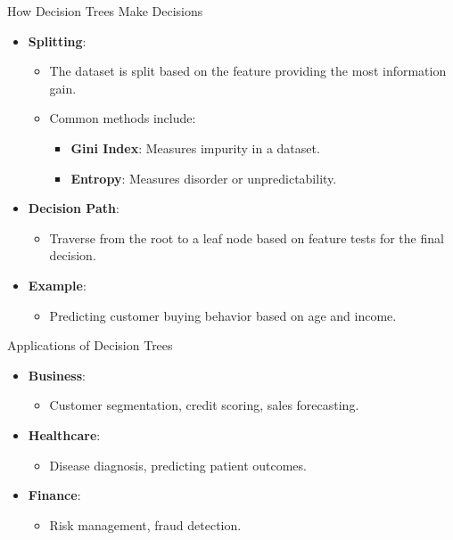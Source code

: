 \documentclass[aspectratio=169]{beamer}
\begin{document}
\begin{frame}[fragile]{How Decision Trees Make Decisions}
  \begin{itemize}
    \item \textbf{Splitting}:
      \begin{itemize}
        \item The dataset is split based on the feature providing the most information gain.
        \item Common methods include:
          \begin{itemize}
            \item \textbf{Gini Index}: Measures impurity in a dataset.
            \item \textbf{Entropy}: Measures disorder or unpredictability.
          \end{itemize}
      \end{itemize}
    \item \textbf{Decision Path}:
      \begin{itemize}
        \item Traverse from the root to a leaf node based on feature tests for the final decision.
      \end{itemize}
    \item \textbf{Example}:
      \begin{itemize}
        \item Predicting customer buying behavior based on age and income.
      \end{itemize}
  \end{itemize}
\end{frame}

\begin{frame}[fragile]{Applications of Decision Trees}
  \begin{itemize}
    \item \textbf{Business}:
      \begin{itemize}
        \item Customer segmentation, credit scoring, sales forecasting.
      \end{itemize}
    \item \textbf{Healthcare}:
      \begin{itemize}
        \item Disease diagnosis, predicting patient outcomes.
      \end{itemize}
    \item \textbf{Finance}:
      \begin{itemize}
        \item Risk management, fraud detection.
      \end{itemize}
  \end{itemize}
\end{frame}
\end{document}
